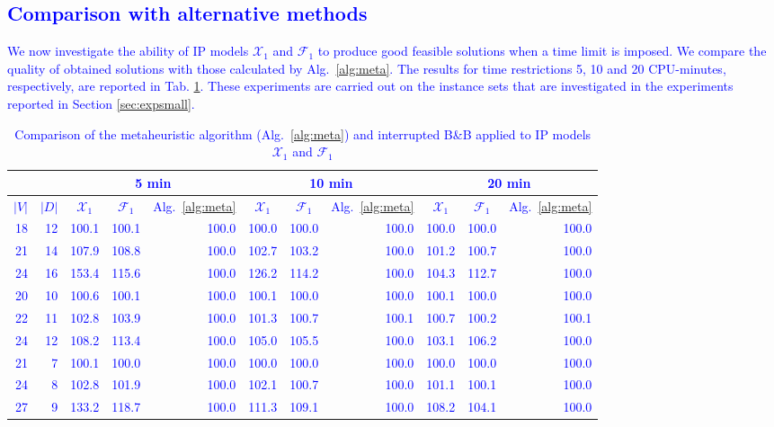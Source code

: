 \textcolor{blue}{\subsection{Comparison with alternative methods}}
\textcolor{blue}{
We now investigate the ability of IP models $\mathcal{X}_1$ and $\mathcal{F}_1$ to produce good feasible solutions when a time limit is imposed.
We compare the quality of obtained solutions with those calculated by Alg.\ \ref{alg:meta}.
The results for time restrictions 5, 10 and 20 CPU-minutes, respectively, are reported in Tab. \ref{tab:metamod}.
These experiments are carried out on the instance sets that are investigated in the experiments reported in Section \ref{sec:expsmall}.
}

\begin{table}[]
\centering
\setlength{\tabcolsep}{6pt} %
\renewcommand{\arraystretch}{1.4} %
\textcolor{blue}{
\begin{tabular}{rrrrrrrrrrr}
\multicolumn{1}{l}{}      & \multicolumn{1}{l}{}      & \multicolumn{3}{c}{5 min}  & \multicolumn{3}{c}{10 min} & \multicolumn{3}{c}{20 min}     \\\hline
\multicolumn{1}{l}{$|V|$} & \multicolumn{1}{l}{$|D|$} & \multicolumn{1}{c}{$\mathcal{X}_1$} & \multicolumn{1}{c}{$\mathcal{F}_1$} & \multicolumn{1}{c}{Alg.\ \ref{alg:meta}} & \multicolumn{1}{c}{$\mathcal{X}_1$} & \multicolumn{1}{c}{$\mathcal{F}_1$} & \multicolumn{1}{c}{Alg.\ \ref{alg:meta}} & \multicolumn{1}{c}{$\mathcal{X}_1$} & \multicolumn{1}{c}{$\mathcal{F}_1$} & \multicolumn{1}{c}{Alg.\ \ref{alg:meta}} \\
\hline
18  & 12   &100.1&100.1&100.0&100.0&100.0&100.0&100.0&100.0&100.0\\
21  & 14   &107.9&108.8&100.0&102.7&103.2&100.0&101.2&100.7&100.0\\
24  & 16   &153.4&115.6&100.0&126.2&114.2&100.0&104.3&112.7&100.0\\     
\hline
20  & 10   &100.6&100.1&100.0&100.1&100.0&100.0&100.1&100.0&100.0\\
22  & 11   &102.8&103.9&100.0&101.3&100.7&100.1&100.7&100.2&100.1\\
24  & 12   &108.2&113.4&100.0&105.0&105.5&100.0&103.1&106.2&100.0\\                               
\hline
21  & 7    &100.1&100.0&100.0&100.0&100.0&100.0&100.0&100.0&100.0\\
24  & 8    &102.8&101.9&100.0&102.1&100.7&100.0&101.1&100.1&100.0\\
27  & 9    &133.2&118.7&100.0&111.3&109.1&100.0&108.2&104.1&100.0                                  
\end{tabular}
}
\caption{\textcolor{blue}{Comparison of the metaheuristic algorithm (Alg.\ \ref{alg:meta}) and interrupted B\&B applied to IP models $\mathcal{X}_1$ and $\mathcal{F}_1$}}
\label{tab:metamod}
\end{table}

